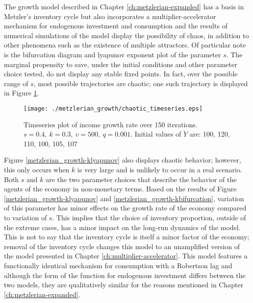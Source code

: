 The growth model described in Chapter \ref{ch:metzlerian-expanded} has a basis in Metzler's inventory cycle but also incorporates a multiplier-accelerator mechanism for endogenous investment and consumption and the results of numerical simulations of the model display the possibility of chaos, in addition to other phenomena such as the existence of multiple attractors. Of particular note is the bifurcation diagram and lyapunov exponent plot of the parameter $s$. The marginal propensity to save, under the initial conditions and other parameter choice tested, do not display any stable fixed points. In fact, over the possible range of $s$, most possible trajectories are chaotic; one such trajectory is displayed in Figure \ref{growth_chaotic-timeseries}.
\begin{figure}
    \centering
    \texttt{[image: ./metzlerian\_growth/chaotic\_timeseries.eps]}
    \caption{Timeseries plot of income growth rate over 150 iterations. $s=0.4,\ k=0.3,\ v=500,\ q=0.001$. Initial values of $\dot Y$ are: 100, 120, 110, 100, 105, 107}
    \label{growth_chaotic-timeseries}
\end{figure}
Figure \ref{metzlerian_growth-klyapunov} also displays chaotic behavior; however, this only occurs when $k$ is very large and is unlikely to occur in a real scenario. Both $s$ and $k$ are the two parameter choices that describe the behavior of the agents of the economy in non-monetary terms. Based on the results of Figure \ref{metzlerian_growth-klyapunov} and \ref{metzlerian_growth-kbifurcation}, variation of this parameter has minor effects on the growth rate of the economy compared to variation of $s$. This implies that the choice of inventory proportion, outside of the extreme cases, has a minor impact on the long-run dynamics of the model. This is not to say that the inventory cycle is itself a minor factor of the economy; removal of the inventory cycle changes this model to an unamplified version of the model presented in Chapter \ref{ch:multiplier-accelerator}. This model features a functionally identical mechanism for consumption with a Robertson lag and although the form of the function for endogenous investment differs between the two models, they are qualitatively similar for the reasons mentioned in Chapter \ref{ch:metzlerian-expanded}.

